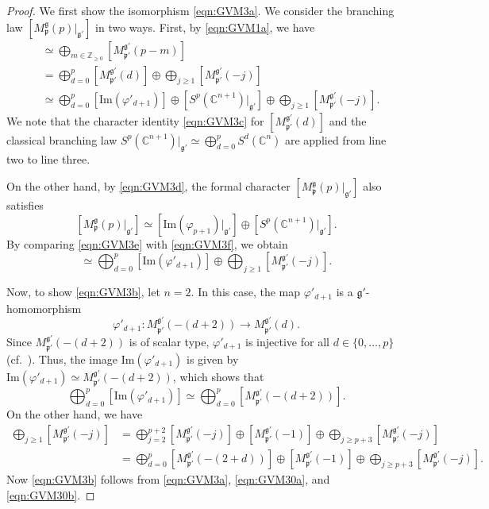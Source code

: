 \documentclass[reqno,11pt]{amsart}
\theoremstyle{remark}
\theoremstyle{definition}
\numberwithin{equation}{section}
\newcommand{\fg}{{\mathfrak g}}
\newcommand{\fp}{{\mathfrak p}}
\newcommand{\C}{\mathbb{C}}
\newcommand{\Z}{\mathbb{Z}}
\renewcommand{\Im}{\mathrm{Im}}
\newcommand{\To}{\longrightarrow}
\newcommand{\Mp}{M^{\fg}_{\fp}}
\newcommand{\Mpp}{M^{\fg'}_{\fp'}}
\begin{document}
\begin{proof}
We first show the isomorphism \eqref{eqn:GVM3a}.
We consider the branching law $[\Mp(p)\vert_{\fg'}]$ in two ways.
First, by \eqref{eqn:GVM1a}, we have 
\begin{align}
[\Mp(p)\vert_{\fg'}] 
&\simeq \bigoplus_{m \in \Z_{\geq 0}}
[\Mpp(p-m)]\\
&= \bigoplus_{d =0}^{p}[\Mpp(d)]
\oplus
\bigoplus_{j\geq 1} [\Mpp(-j)] \nonumber \\
&\simeq 
\bigoplus_{d =0}^{p}[\Im(\varphi'_{d+1})]
\oplus
[S^p(\C^{n+1})\vert_{\fg'}]
\oplus
\bigoplus_{j\geq 1} [\Mpp(-j)].\label{eqn:GVM3e}
\end{align}
We note that
the character identity
 \eqref{eqn:GVM3c} for $[\Mpp(d)]$ and the classical branching law
$S^p(\C^{n+1})\vert_{\fg'} \simeq \bigoplus_{d=0}^pS^d(\C^{n})$
are applied from line two to line three.

On the other hand, by \eqref{eqn:GVM3d}, the formal character 
$[\Mp(p)\vert_{\fg'}]$ also satisfies
\begin{equation}\label{eqn:GVM3f}
[\Mp(p)\vert_{\fg'}] \simeq [\Im(\varphi_{p+1})\vert_{\fg'}] \oplus 
[S^p(\C^{n+1})\vert_{\fg'}].
\end{equation}
By comparing \eqref{eqn:GVM3e} with \eqref{eqn:GVM3f}, we obtain
\begin{equation*}
[\Im(\varphi_{p+1})\vert_{\fg'}] \simeq
\bigoplus_{d =0}^{p}[\Im(\varphi'_{d+1})]
\oplus
\bigoplus_{j\geq 1} [\Mpp(-j)].
\end{equation*}

Now, to show \eqref{eqn:GVM3b}, let $n=2$. In this case, 
the map $\varphi'_{d+1}$ is a $\fg'$-homomorphism
\begin{equation*}
\varphi'_{d+1}\colon \Mpp(-(d+2)) \To \Mpp(d).
\end{equation*}
Since $\Mpp(-(d+2))$ is of scalar type,
$\varphi'_{d+1}$ is injective for all $d \in \{0,\ldots, p\}$
(cf.\ \cite[Prop.\ 9.11]{Hum08}).
Thus, the image $\Im(\varphi'_{d+1})$ is given by
$\Im(\varphi'_{d+1})\simeq \Mpp(-(d+2))$, which shows that
\begin{equation}\label{eqn:GVM30a}
\bigoplus_{d =0}^{p}[\Im(\varphi'_{d+1})] \simeq 
\bigoplus_{d =0}^{p}[\Mpp(-(d+2))].
\end{equation}
On the other hand, we have 
\begin{align}
\bigoplus_{j\geq 1} [\Mpp(-j)]
&=
\bigoplus_{j =2}^{p+2}[\Mpp(-j)] \oplus [\Mpp(-1)] \oplus 
\bigoplus_{j\geq p+3} [\Mpp(-j)]\nonumber\\
&=\bigoplus_{d =0}^{p}[\Mpp(-(2+d))] \oplus [\Mpp(-1)] \oplus 
\bigoplus_{j\geq p+3} [\Mpp(-j)].\label{eqn:GVM30b}
\end{align}
Now \eqref{eqn:GVM3b} follows from \eqref{eqn:GVM3a}, 
\eqref{eqn:GVM30a}, and \eqref{eqn:GVM30b}.
\end{proof}
\end{document}
